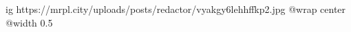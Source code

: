  
 
 
 
 

\ifcmt
  ig https://mrpl.city/uploads/posts/redactor/vyakgy6lehhffkp2.jpg
  @wrap center
  @width 0.5
\fi
